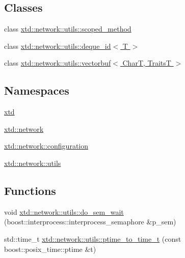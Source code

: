 \subsection*{Classes}
\begin{DoxyCompactItemize}
\item 
class \hyperlink{classxtd_1_1network_1_1utils_1_1scoped__method}{xtd\+::network\+::utils\+::scoped\+\_\+method}
\item 
class \hyperlink{classxtd_1_1network_1_1utils_1_1deque__id}{xtd\+::network\+::utils\+::deque\+\_\+id$<$ T $>$}
\item 
class \hyperlink{classxtd_1_1network_1_1utils_1_1vectorbuf}{xtd\+::network\+::utils\+::vectorbuf$<$ Char\+T, Traits\+T $>$}
\end{DoxyCompactItemize}
\subsection*{Namespaces}
\begin{DoxyCompactItemize}
\item 
 \hyperlink{namespacextd}{xtd}
\item 
 \hyperlink{namespacextd_1_1network}{xtd\+::network}
\item 
 \hyperlink{namespacextd_1_1network_1_1configuration}{xtd\+::network\+::configuration}
\item 
 \hyperlink{namespacextd_1_1network_1_1utils}{xtd\+::network\+::utils}
\end{DoxyCompactItemize}
\subsection*{Functions}
\begin{DoxyCompactItemize}
\item 
void \hyperlink{namespacextd_1_1network_1_1utils_a181758eb475ef5f4aebfec6c0ebec0c5}{xtd\+::network\+::utils\+::do\+\_\+sem\+\_\+wait} (boost\+::interprocess\+::interprocess\+\_\+semaphore \&p\+\_\+sem)
\item 
std\+::time\+\_\+t \hyperlink{namespacextd_1_1network_1_1utils_aeee4bc5a0636807dd491f21938b7a1ca}{xtd\+::network\+::utils\+::ptime\+\_\+to\+\_\+time\+\_\+t} (const boost\+::posix\+\_\+time\+::ptime \&t)
\end{DoxyCompactItemize}
